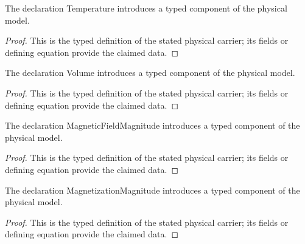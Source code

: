 \begin{definition}
  \label{def:physics:IPhO_2026_3_C_2:aux007}
  The declaration Temperature introduces a typed component of the physical model.
\end{definition}
\begin{proof}
  This is the typed definition of the stated physical carrier; its fields or defining equation provide the claimed data.
\end{proof}

\begin{definition}
  \label{def:physics:IPhO_2026_3_C_2:aux008}
  The declaration Volume introduces a typed component of the physical model.
\end{definition}
\begin{proof}
  This is the typed definition of the stated physical carrier; its fields or defining equation provide the claimed data.
\end{proof}

\begin{definition}
  \label{def:physics:IPhO_2026_3_C_2:aux009}
  The declaration MagneticFieldMagnitude introduces a typed component of the physical model.
\end{definition}
\begin{proof}
  This is the typed definition of the stated physical carrier; its fields or defining equation provide the claimed data.
\end{proof}

\begin{definition}
  \label{def:physics:IPhO_2026_3_C_2:aux010}
  The declaration MagnetizationMagnitude introduces a typed component of the physical model.
\end{definition}
\begin{proof}
  This is the typed definition of the stated physical carrier; its fields or defining equation provide the claimed data.
\end{proof}

